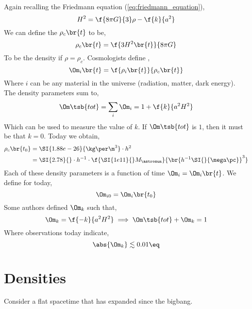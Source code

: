 \documentclass{article}
\begin{document}
Again recalling the Friedmann equation (\cref{eq:friedmann_equation}),
\[ H^2 = \f{8 \pi G}{3}\rho - \f{k}{a^2} \]
We can define the  $\rho_{c}\br{t}$ to be,
\[ \rho_{c}\br{t} = \f{3 H^2\br{t}}{8 \pi G} \]
To be the density if $\rho = \rho_c$. Cosmologists define ,
\[ \Om_i \br{t} = \f{\rho_i\br{t}}{\rho_c\br{t}} \]
Where $i$ can be any material in the universe (radiation, matter, dark energy). The density parameters sum to,
\[ \Om\tsb{tot} = \sum_{i} \Om_i = 1 + \f{k}{a^2 H^2} \]
Which can be used to measure the value of $k$. If $\Om\tsb{tot}$ is $1$, then it must be that $k = 0$. Today we obtain,
\begin{align*}
    \rho_c\br{t_0}
    &= \SI{1.88e-26}{\kg \per \m^3} \cdot h^2\\
    &= \SI{2.78}{} \cdot h^{-1} \cdot \f{\SI{1e11}{} M_{\astrosun}}{\br{h^{-1} \SI{}{\mega\pc}}^3}
\end{align*}
Each of these density parameters is a function of time $\Om_i = \Om_i\br{t}$. We define for today,
\[ \Om_{i0} = \Om_i\br{t_0} \]
Some authors defined $\Om_k$ such that,
\[ \Om_k = \f{-k}{a^2 H^2} \implies \Om\tsb{tot} + \Om_k = 1 \]
Where observations today indicate,
\[ \abs{\Om_k} \lesssim 0.01 \eq \label{eq:k_om} \]
\section{Densities}
Consider a flat spacetime that has expanded since the bigbang.

\begin{center}
\end{center}
\end{document}
